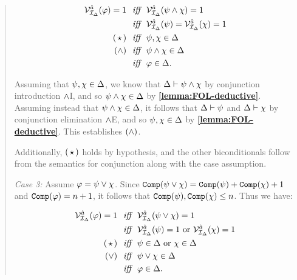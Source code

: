 \begin{quote}
  \vspace{-.2in}
  \begin{align*}
    \mathcal{V}_{\mathcal{I}_{\Delta}}^{\hat{a}}(\varphi)=1 &\textit{ ~iff~ } \mathcal{V}_{\mathcal{I}_{\Delta}}^{\hat{a}}(\psi\wedge\chi)=1\\
      &\textit{ ~iff~ } \mathcal{V}_{\mathcal{I}_{\Delta}}^{\hat{a}}(\psi)=\mathcal{V}_{\mathcal{I}_{\Delta}}^{\hat{a}}(\chi)=1 \\
      (\hspace{1.6pt}\star\hspace{1.6pt}) &\textit{ ~iff~ } \psi,\chi\in\Delta \\
      (\wedge) &\textit{ ~iff~ } \psi\wedge\chi\in\Delta \\
      &\textit{ ~iff~ } \varphi\in\Delta.
  \end{align*}

  Assuming that $\psi,\chi\in\Delta$, we know that $\Delta\vdash\psi\wedge\chi$ by conjunction introduction $\wedge$I, and so $\psi\wedge\chi\in\Delta$ by \textbf{\ref{lemma:FOL-deductive}}.
  Assuming instead that $\psi\wedge\chi\in\Delta$, it follows that $\Delta\vdash\psi$ and $\Delta\vdash\chi$ by conjunction elimination $\wedge$E, and so $\psi,\chi\in\Delta$ by \textbf{\ref{lemma:FOL-deductive}}.
  This establishes $(\wedge)$.

  Additionally, $(\hspace{1.6pt}\star\hspace{1.6pt})$ holds by hypothesis, and the other biconditionals follow from the semantics for conjunction along with the case assumption.


  \textit{Case 3:}
  Assume $\varphi=\psi\vee\chi$.
  Since $\texttt{Comp}(\psi\vee\chi)=\texttt{Comp}(\psi)+\texttt{Comp}(\chi)+1$ and  $\texttt{Comp}(\varphi)=n+1$, it follows that $\texttt{Comp}(\psi),\texttt{Comp}(\chi)\leq n$.
  Thus we have:

  \vspace{-.2in}
  \begin{align*}
    \mathcal{V}_{\mathcal{I}_{\Delta}}^{\hat{a}}(\varphi)=1 &\textit{ ~iff~ } \mathcal{V}_{\mathcal{I}_{\Delta}}^{\hat{a}}(\psi\vee\chi)=1\\
      &\textit{ ~iff~ } \mathcal{V}_{\mathcal{I}_{\Delta}}^{\hat{a}}(\psi)=1 \text{ or } \mathcal{V}_{\mathcal{I}_{\Delta}}^{\hat{a}}(\chi)=1 \\
      (\hspace{1.6pt}\star\hspace{1.6pt}) &\textit{ ~iff~ } \psi\in\Delta \text{ or } \chi\in\Delta \\
      (\vee) &\textit{ ~iff~ } \psi\vee\chi\in\Delta \\
      &\textit{ ~iff~ } \varphi\in\Delta.
  \end{align*}


\end{quote}

